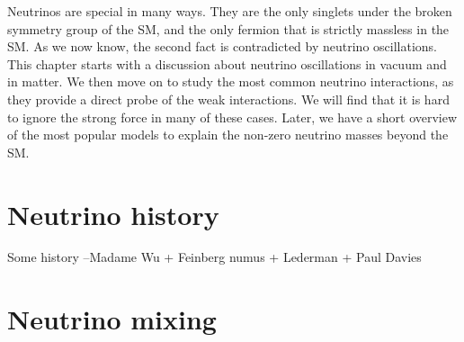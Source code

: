 \graphicspath{{}{theory/}{Diagrams/}}

Neutrinos are special in many ways. They are the only singlets under the broken symmetry group of the SM, and the only fermion that is strictly massless in the SM. As we now know, the second fact is contradicted by neutrino oscillations. This chapter starts with a discussion about neutrino oscillations in vacuum and in matter. We then move on to study the most common neutrino interactions, as they provide a direct probe of the weak interactions. We will find that it is hard to ignore the strong force in many of these cases. Later, we have a short overview of the most popular models to explain the non-zero neutrino masses beyond the SM.

\section{Neutrino history}


Some history --Madame Wu + Feinberg numus + Lederman + Paul Davies 

\section{Neutrino mixing}

